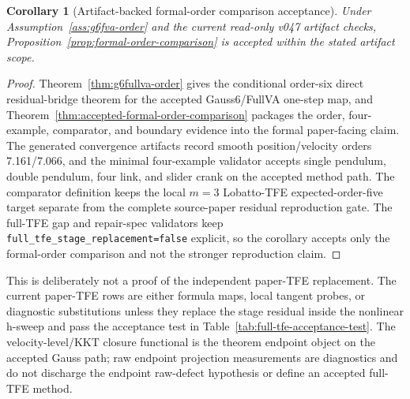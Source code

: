 \documentclass[11pt]{article}
\newtheorem{corollary}{Corollary}
\newcommand{\method}{Gauss6/FullVA}
\newcommand{\tfe}{TFE}
\begin{document}
\begin{corollary}[Artifact-backed formal-order comparison acceptance]
\label{cor:artifact-backed-acceptance}
Under Assumption~\ref{ass:g6fva-order} and the current read-only v047 artifact
checks, Proposition~\ref{prop:formal-order-comparison} is accepted within the stated
artifact scope.
\end{corollary}

\begin{proof}
Theorem~\ref{thm:g6fullva-order} gives the conditional order-six direct
residual-bridge theorem for the accepted \method{} one-step map, and
Theorem~\ref{thm:accepted-formal-order-comparison} packages the order,
four-example, comparator, and boundary evidence into the formal paper-facing
claim.  The generated convergence artifacts record smooth position/velocity
orders 7.161/7.066, and the minimal four-example validator accepts single
pendulum, double pendulum, four link, and slider crank on the accepted method
path.  The comparator definition keeps the local $m=3$ Lobatto-\tfe{}
expected-order-five target separate from the complete source-paper residual
reproduction gate.  The full-\tfe{} gap and repair-spec validators keep
\nolinkurl{full_tfe_stage_replacement=false} explicit, so the corollary
accepts only the formal-order comparison and not the stronger reproduction
claim.
\end{proof}

This is deliberately not a proof of the independent paper-\tfe{} replacement.
The current paper-\tfe{} rows are either formula maps, local tangent probes, or
diagnostic substitutions unless they replace the stage residual inside the
nonlinear h-sweep and pass the acceptance test in
Table~\ref{tab:full-tfe-acceptance-test}.  The velocity-level/KKT closure
functional is the theorem endpoint object on the accepted Gauss path; raw
endpoint projection measurements are diagnostics and do not discharge the
endpoint raw-defect hypothesis or define an accepted full-\tfe{} method.
\end{document}
